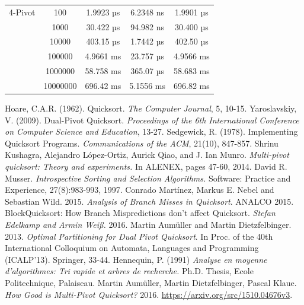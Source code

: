 \documentclass{article}
\begin{document}
\begin{center}
\begin{tabular}{ |c c | c c c| }
        \hline
        4-Pivot         & 100      & 1.9923 µs    &	6.2348 ns   & 1.9901 µs \\
                        & 1000     & 30.422 µs    &	94.982 ns   & 30.400 µs \\
                        & 10000    & 403.15 µs    & 1.7442 µs   & 402.50 µs \\
                        & 100000   & 4.9661 ms    & 23.757 µs   & 4.9566 ms \\
                        & 1000000  & 58.758 ms    & 365.07 µs 	& 58.683 ms \\
                        & 10000000 & 696.42 ms    & 5.1556 ms   & 696.82 ms \\
        \hline
    \end{tabular}
\end{center}

\begin{thebibliography}{99}

 \label{HoareQuickSort} Hoare, C.A.R. (1962). Quicksort. \textit{The Computer Journal}, 5, 10-15.
 \label{Yaroslavskiy} Yaroslavskiy, V. (2009). Dual-Pivot Quicksort. \textit{Proceedings of the 6th International Conference on Computer Science and Education}, 13-27.
 \label{Sedgewick} Sedgewick, R. (1978). Implementing Quicksort Programs. \textit{Communications of the ACM}, 21(10), 847-857.
 \label{Kushagra} {Shrinu Kushagra, Alejandro López-Ortiz, Aurick Qiao, and J. Ian Munro. \textit{Multi-pivot quicksort: Theory and experiments.} In ALENEX, pages 47-60, 2014.}
 \label{Introsort} David R. Musser. \textit{Introspective Sorting and Selection Algorithms.} Software: Practice and Experience, 27(8):983-993, 1997.
 \label{AnalysisOfBranchMissesInQuickSort} Conrado Martínez, Markus E. Nebel and Sebastian Wild. 2015. \textit{Analysis of Branch Misses in Quicksort}. ANALCO 2015.
 \label{BlockQuickSort} BlockQuicksort: How Branch Mispredictions don't affect Quicksort. \textit{Stefan Edelkamp and Armin Weiß.} 2016.
 \label{OptimalPartitioningForDualPivotQuicksort} Martin Aumüller and Martin Dietzfelbinger. 2013. \textit{Optimal Partitioning for Dual Pivot Quicksort}. In Proc.
of the 40th International Colloquium on Automata, Languages and Programming (ICALP'13). Springer, 33-44.
 \label{Hennequin} Hennequin, P. (1991) \textit{Analyse en moyenne d'algorithmes: Tri rapide et arbres de recherche.} Ph.D. Thesis, Ecole Politechnique, Palaiseau.
 \label{HowGoodIsMultiPivotQuicksort} Martin Aumüller, Martin Dietzfelbinger, Pascal Klaue. \textit{How Good is Multi-Pivot Quicksort?} 2016. \url{https://arxiv.org/src/1510.04676v3}.
\end{thebibliography}
\end{document}

